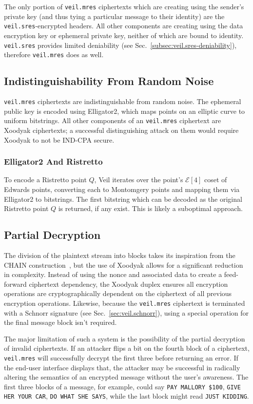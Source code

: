 The only portion of \texttt{veil.mres} ciphertexts which are creating using the sender's private key (and thus tying
a particular message to their identity) are the \texttt{veil.sres}-encrypted headers.
All other components are creating using the data encryption key or ephemeral private key, neither of which are bound
to identity.
\texttt{veil.sres} provides limited deniability (see Sec.~\ref{subsec:veil.sres-deniability}), therefore
\texttt{veil.mres} does as well.

\subsection{Indistinguishability From Random Noise}\label{subsec:veil.mres-indistinguishability}

\texttt{veil.mres} ciphertexts are indistinguishable from random noise.
The ephemeral public key is encoded using Elligator2, which maps points on an elliptic curve to uniform bitstrings.
All other components of an \texttt{veil.mres} ciphertext are Xoodyak ciphertexts;
a successful distinguishing attack on them would require Xoodyak to not be IND-CPA secure.

\subsubsection{Elligator2 And Ristretto}

To encode a Ristretto point $Q$, Veil iterates over the point's $\mathcal E[4]$ coset of Edwards points, converting each
to Montomgery points and mapping them via Elligator2 to bitstrings.
The first bitstring which can be decoded as the original Ristretto point $Q$ is returned, if any exist.
This is likely a suboptimal approach.

\subsection{Partial Decryption}\label{subsec:veil.mres-partial-decryption}

The division of the plaintext stream into blocks takes its inspiration from the CHAIN construction~\cite{hoang2015}, but
the use of Xoodyak allows for a significant reduction in complexity.
Instead of using the nonce and associated data to create a feed-forward ciphertext dependency, the Xoodyak duplex
ensures all encryption operations are cryptographically dependent on the ciphertext of all previous encryption
operations.
Likewise, because the \texttt{veil.mres} ciphertext is terminated with a Schnorr signature (see
Sec.~\ref{sec:veil.schnorr}), using a special operation for the final message block isn't required.

The major limitation of such a system is the possibility of the partial decryption of invalid ciphertexts.
If an attacker flips a bit on the fourth block of a ciphertext, \texttt{veil.mres} will successfully decrypt the first
three before returning an error.
If the end-user interface displays that, the attacker may be successful in radically altering the semantics of an
encrypted message without the user's awareness.
The first three blocks of a message, for example, could say \texttt{PAY MALLORY \$100}, \texttt{GIVE HER YOUR CAR},
\texttt{DO WHAT SHE SAYS}, while the last block might read \texttt{JUST KIDDING}.

